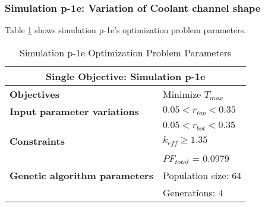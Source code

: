 \subsubsection{Simulation p-1e: Variation of Coolant channel shape}
Table \ref{tab:simulationp1e} shows simulation p-1e's optimization problem parameters. 
\begin{table}[htbp!]
    \centering
    \onehalfspacing
    \caption{Simulation p-1e Optimization Problem Parameters}
	\label{tab:simulationp1e}
    \footnotesize
    \begin{tabular}{l|p{3cm}}
    \hline 
    \multicolumn{2}{c}{\textbf{Single Objective: Simulation p-1e}} \\
    \hline 
    \textbf{Objectives} & Minimize $T_{max}$ \\
    \hline 
    \textbf{Input parameter variations} & $0.05<r_{top}<0.35$ \\
    & $0.05<r_{bot}<0.35$ \\
    \hline
    \textbf{Constraints} & $k_{eff} \geq 1.35$\\ 
    & $PF_{total}$ = 0.0979\\
    \hline 
    \textbf{Genetic algorithm parameters} & Population size: 64 \\
    & Generations: 4 \\
    \hline
    \end{tabular}
\end{table}

